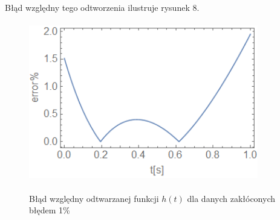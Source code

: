 \documentclass[twoside]{projektInzynierskiMS1}
\newcounter{rowcnt}
\newcommand\rownum{\ifnumequal{\value{rowcnt}}{0}{\textbf{Nr.}}{\therowcnt.}\refstepcounter{rowcnt}}
\newcommand{\newLine}{~\\}
\begin{document}
Błąd względny tego odtworzenia ilustruje rysunek 8. \\

\begin{figure}[H]
\begin{center}
		\includegraphics[height=7cm, width=10cm]{pics/1abs.png}\\
	\caption{Błąd względny odtwarzanej funkcji $h(t)$ dla danych zakłóconych błędem 1\%}
\end{center}
\end{figure}




\end{document}
